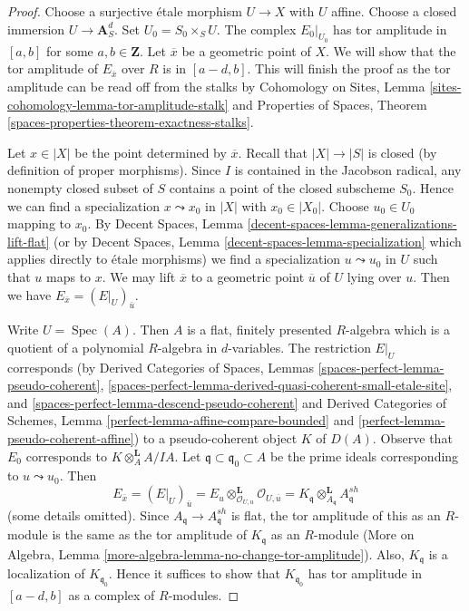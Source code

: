 \documentclass[10pt,a4paper]{amsart}
\theoremstyle{plain}
\theoremstyle{definition}
\theoremstyle{remark}
\numberwithin{equation}{subsection}
\def\Spec{\mathop{\mathrm{Spec}}}
\begin{document}
\begin{proof}
Choose a surjective \'etale morphism $U \to X$ with $U$ affine.
Choose a closed immersion $U \to \mathbf{A}^d_S$.
Set $U_0 = S_0 \times_S U$.
The complex $E_0|_{U_0}$ has tor amplitude
in $[a, b]$ for some $a, b \in \mathbf{Z}$.
Let $\overline{x}$ be a geometric point of $X$.
We will show that the tor amplitude of
$E_{\overline{x}}$ over $R$ is in $[a - d, b]$.
This will finish the proof as the tor amplitude can be
read off from the stalks by
Cohomology on Sites, Lemma \ref{sites-cohomology-lemma-tor-amplitude-stalk}
and Properties of Spaces, Theorem
\ref{spaces-properties-theorem-exactness-stalks}.

\medskip\noindent
Let $x \in |X|$ be the point determined by $\overline{x}$.
Recall that $|X| \to |S|$ is closed (by definition of proper morphisms).
Since $I$ is contained in the Jacobson radical, any nonempty closed
subset of $S$ contains a point of the closed subscheme $S_0$.
Hence we can find a specialization $x \leadsto x_0$ in $|X|$
with $x_0 \in |X_0|$. Choose $u_0 \in U_0$ mapping to $x_0$.
By Decent Spaces, Lemma \ref{decent-spaces-lemma-generalizations-lift-flat}
(or by Decent Spaces, Lemma \ref{decent-spaces-lemma-specialization}
which applies directly to \'etale morphisms)
we find a specialization $u \leadsto u_0$ in $U$
such that $u$ maps to $x$. We may lift $\overline{x}$
to a geometric point $\overline{u}$ of $U$ lying over $u$.
Then we have $E_{\overline{x}} = (E|_U)_{\overline{u}}$.

\medskip\noindent
Write $U = \Spec(A)$. Then $A$ is a flat, finitely presented
$R$-algebra which is a quotient of a polynomial $R$-algebra in
$d$-variables. The restriction $E|_U$ corresponds
(by Derived Categories of Spaces, Lemmas
\ref{spaces-perfect-lemma-pseudo-coherent},
\ref{spaces-perfect-lemma-derived-quasi-coherent-small-etale-site}, and
\ref{spaces-perfect-lemma-descend-pseudo-coherent}
and
Derived Categories of Schemes, Lemma
\ref{perfect-lemma-affine-compare-bounded} and
\ref{perfect-lemma-pseudo-coherent-affine})
to a pseudo-coherent object $K$ of $D(A)$.
Observe that $E_0$ corresponds to $K \otimes_A^\mathbf{L} A/IA$.
Let $\mathfrak q \subset \mathfrak q_0 \subset A$ be the prime
ideals corresponding to $u \leadsto u_0$.
Then
$$
E_{\overline{x}} =
(E|_U)_{\overline{u}} =
E_u \otimes_{\mathcal{O}_{U, u}}^\mathbf{L} \mathcal{O}_{U, \overline{u}} =
K_{\mathfrak q} \otimes_{A_\mathfrak q}^\mathbf{L} A_{\mathfrak q}^{sh}
$$
(some details omitted). Since $A_\mathfrak q \to A_\mathfrak q^{sh}$
is flat, the tor amplitude of this as an $R$-module is the same as
the tor amplitude of $K_\mathfrak q$ as an $R$-module
(More on Algebra, Lemma \ref{more-algebra-lemma-no-change-tor-amplitude}).
Also, $K_{\mathfrak q}$ is a localization of $K_{\mathfrak q_0}$.
Hence it suffices to show that $K_{\mathfrak q_0}$ has tor amplitude in
$[a - d, b]$ as a complex of $R$-modules.


\end{proof}
\end{document}
